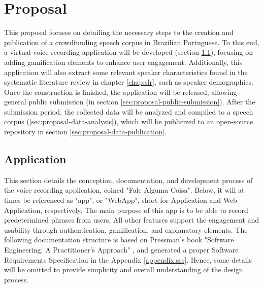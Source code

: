 \chapter[Proposal]{Proposal}
\label{chap:proposal}

This proposal focuses on detailing the necessary steps to the creation and publication of a crowdfunding speech corpus in Brazilian Portuguese. To this end, a virtual voice recording application will be developed (section \ref{sec:proposal-app}), focusing on adding gamification elements to enhance user engagement. Additionally, this application will also extract some relevant speaker characteristics found in the systematic literature review in chapter \ref{chap:slr}, such as speaker demographics. Once the construction is finished, the application will be released, allowing general public submission (in section \ref{sec:proposal-public-submission}). After the submission period, the collected data will be analyzed and compiled to a speech corpus (\ref{sec:proposal-data-analysis}), which will be publicized to an open-source repository in section \ref{sec:proposal-data-publication}.

\section{Application}
\label{sec:proposal-app}

This section details the conception, documentation, and development process of the voice recording application, coined "Fale Alguma Coisa". Below, it will at times be referenced as "app", or "WebApp", short for Application and Web Application, respectively. The main purpose of this app is to be able to record predetermined phrases from users. All other features support the engagement and usability through authentication, gamification, and explanatory elements. The following documentation structure is based on Pressman's book "Software Engineering: A Practitioner's Approach" \cite{pressman2014software}, and generated a proper Software Requirements Specification in the Appendix \ref{appendix:srs}. Hence, some details will be omitted to provide simplicity and overall understanding of the design process.

